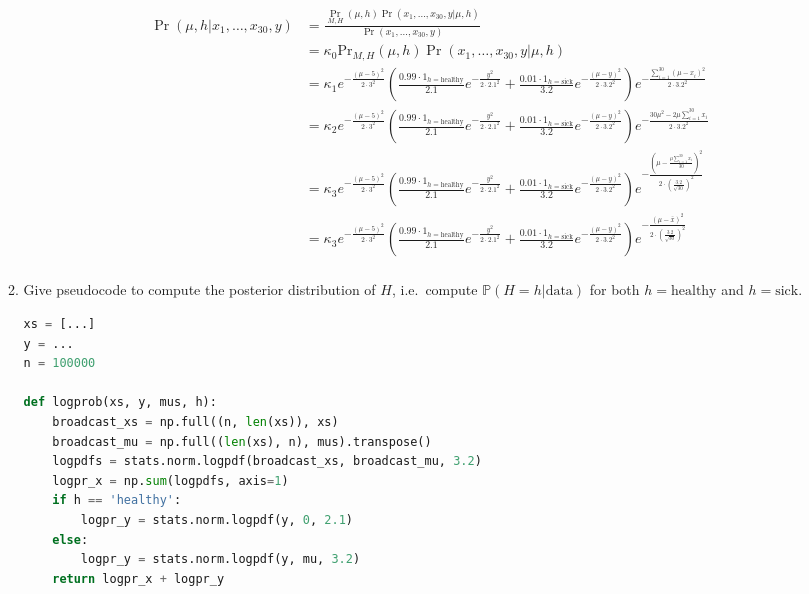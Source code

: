 \documentclass[10pt,\jkfside,a4paper]{article}
\begin{document}
\begin{enumerate}
\begin{enumerate}[label=(\alph*)]
\[
\begin{split}
\Pr(\mu, h | x_1, \dots, x_{30}, y)
&= \frac{\Pr_{M, H}(\mu, h) \Pr\left(x_1, \dots, x_{30}, y| \mu, h\right)}{
\Pr\left( x_1, \dots, x_{30}, y \right) } \\
&= \kappa_0 \text{Pr}_{M, H}(\mu, h) \Pr \left(x_1, \dots, x_{30}, y| \mu,
h\right) \\
&= \kappa_1 e^{-\frac{\left( \mu - 5 \right)^2}{2\cdot 3^2}}
\left( \frac{ 0.99\cdot 1_{h=\text{healthy}}}{2.1}e^{-\frac{y^2}{{2 \cdot 2.1^2}}} +
\frac{0.01 \cdot 1_{h=\text{sick}}}{3.2} e^{-\frac{\left( \mu - y \right)^2}{{2 \cdot 3.2^2}}}
\right) e^{-\frac{\sum^{30}_{i=1}\left( \mu - x_i \right)^2}{2 \cdot 3.2^2}} \\
&= \kappa_2 e^{-\frac{\left( \mu - 5 \right)^2}{2\cdot 3^2}}
\left( \frac{ 0.99\cdot 1_{h=\text{healthy}}}{2.1}e^{-\frac{y^2}{{2 \cdot 2.1^2}}} +
\frac{0.01 \cdot 1_{h=\text{sick}}}{3.2} e^{-\frac{\left( \mu - y \right)^2}{{2 \cdot 3.2^2}}}
\right) e^{-\frac{30\mu^2 - 2\mu\sum^{30}_{i=1}x_i}{2 \cdot 3.2^2}} \\
&= \kappa_3 e^{-\frac{\left( \mu - 5 \right)^2}{2\cdot 3^2}}
\left( \frac{ 0.99\cdot 1_{h=\text{healthy}}}{2.1}e^{-\frac{y^2}{{2 \cdot 2.1^2}}} +
\frac{0.01 \cdot 1_{h=\text{sick}}}{3.2} e^{-\frac{\left( \mu - y \right)^2}{{2 \cdot 3.2^2}}}
\right) e^{-\frac{\left(\mu - \frac{\mu\sum^{30}_{i=1}x_i}{30}\right)^2}{2
\cdot \left(\frac{3.2}{\sqrt{30}}\right)^2}} \\
&= \kappa_3 e^{-\frac{\left( \mu - 5 \right)^2}{2\cdot 3^2}}
\left( \frac{ 0.99\cdot 1_{h=\text{healthy}}}{2.1}e^{-\frac{y^2}{{2 \cdot 2.1^2}}} +
\frac{0.01 \cdot 1_{h=\text{sick}}}{3.2} e^{-\frac{\left( \mu - y \right)^2}{{2 \cdot 3.2^2}}}
\right) e^{-\frac{\left(\mu - \bar{x}\right)^2}{2
\cdot \left(\frac{3.2}{\sqrt{30}}\right)^2}} \\
\end{split}
\]

\item Give pseudocode to compute the posterior distribution of $H$, i.e.\
compute $\mathbb{P}\left( H=h|\text{data} \right)$ for both
$h=\text{healthy}$ and $h=\text{sick}$.

\begin{lstlisting}[language=Python]
xs = [...]
y = ...
n = 100000

def logprob(xs, y, mus, h):
	broadcast_xs = np.full((n, len(xs)), xs)
	broadcast_mu = np.full((len(xs), n), mus).transpose()
	logpdfs = stats.norm.logpdf(broadcast_xs, broadcast_mu, 3.2)
	logpr_x = np.sum(logpdfs, axis=1)
	if h == 'healthy':
		logpr_y = stats.norm.logpdf(y, 0, 2.1)
	else:
		logpr_y = stats.norm.logpdf(y, mu, 3.2)
	return logpr_x + logpr_y


\end{lstlisting}
\end{enumerate}
\end{enumerate}
\end{document}
